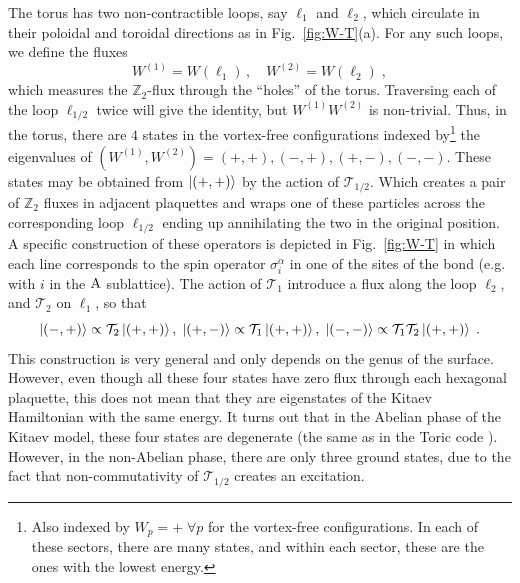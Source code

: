 The torus has two non-contractible loops, say $\ell_1$ and $\ell_2$, which circulate in their poloidal and toroidal directions as in Fig.~\ref{fig:W-T}(a). For any such loops, we define the fluxes
\begin{equation}
    W^{(1)}=W(\ell_1) \, , \quad
    W^{(2)}=W(\ell_2) \; ,
\end{equation}
which measures the $\mathbb{Z}_2$-flux through the %
``holes'' of the torus.  Traversing each of the loop $\ell_{1/2}$ twice will give the identity, but   $W^{(1)}W^{(2)}$ is non-trivial. Thus, in the torus, there are  $4$ states in the vortex-free configurations indexed by\footnote{Also indexed by $W_p=+ \; \forall p$ for the vortex-free configurations. In each of these sectors, there are many states, and within each sector, these are the ones with the lowest energy. } the eigenvalues of $(W^{(1)},W^{(2)})=(+,+),(-,+),(+,-),(-,-)$. %
These states may be obtained from $\ket{(+,+)}$ by the action of $\mathcal{T}_{1/2}$. Which creates a pair of $\mathbb{Z}_2$ fluxes in adjacent plaquettes and wraps one of these particles across the corresponding loop $\ell_{1/2}$ ending up annihilating the two in the original position.  A specific construction of these operators is depicted in Fig.~\ref{fig:W-T} in which each line corresponds to the spin operator $\sigma_i^\alpha$ in one of the sites of the bond (e.g. with $i$ in the $\mathrm{A}$ sublattice). The action of $\mathcal{T}_{1}$ introduce a flux along the loop $\ell_2$, and $\mathcal{T}_{2}$ on $\ell_1$, so that\vspace*{-2mm}%
\begin{equation}%
\ket{(-,+) }\propto \mathcal{T}_2\ket{(+,+)}, \;
\ket{(+,-) }\propto \mathcal{T}_1\ket{(+,+)}, \;
\ket{(-,-) }\propto \mathcal{T}_1\mathcal{T}_2\ket{(+,+)} \; .\vspace*{-1mm}%
\end{equation}
This construction is very general and only depends on the genus of the surface. However, even though all these four states have zero flux through each hexagonal plaquette, this does not mean that they are eigenstates of the Kitaev Hamiltonian with the same energy.
It turns out that in the Abelian phase of the Kitaev model, these four states are degenerate  (the same as in the Toric code \cite{Kitaev2003}).
However, in the non-Abelian phase, there are only three ground states, due to the fact that non-commutativity of $\mathcal{T}_{1/2}$ creates an excitation.

